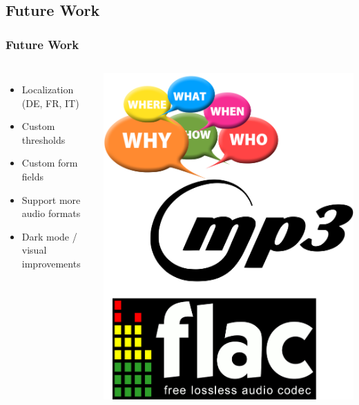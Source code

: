 \subsection{Future Work}\label{subsec:future-work}
\begin{frame}
    \frametitle{Future Work}
    \begin{columns}
        \begin{itemize}
            \large
            \item Localization (DE, FR, IT)
            \item Custom thresholds
            \item Custom form fields
            \item Support more audio formats
            \item Dark mode / visual improvements
        \end{itemize}
        \centering
        \includegraphics[width=0.7\linewidth]{../assets/future_work.png}
    \end{columns}
\end{frame}

